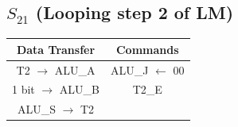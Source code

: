 \documentclass[]{report}
\begin{document}
            \subsection*{$S_{21}$ (Looping step 2 of LM)} %
            \begin{center}
                \begin{tabular}{|c|c|}
                    \hline
                    Data Transfer & Commands \\
                    \hline
                    T2 $\to$ ALU\_A & ALU\_J $\leftarrow$ 00\\
                    1 bit $\to$ ALU\_B & T2\_E\\        %
                    ALU\_S $\to$ T2 & \\
                    \hline
                \end{tabular}
            \end{center} 
\end{document}

